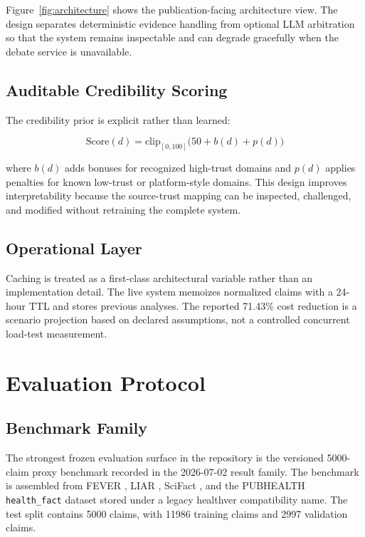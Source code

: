 \documentclass[conference]{IEEEtran}
\begin{document}
Figure~\ref{fig:architecture} shows the publication-facing architecture view. The design separates deterministic evidence handling from optional LLM arbitration so that the system remains inspectable and can degrade gracefully when the debate service is unavailable.

\subsection{Auditable Credibility Scoring}

The credibility prior is explicit rather than learned:

\[
\mathrm{Score}(d) = \mathrm{clip}_{[0,100]}\bigl(50 + b(d) + p(d)\bigr)
\]

where $b(d)$ adds bonuses for recognized high-trust domains and $p(d)$ applies penalties for known low-trust or platform-style domains. This design improves interpretability because the source-trust mapping can be inspected, challenged, and modified without retraining the complete system.

\subsection{Operational Layer}

Caching is treated as a first-class architectural variable rather than an implementation detail. The live system memoizes normalized claims with a 24-hour TTL and stores previous analyses. The reported 71.43\% cost reduction is a scenario projection based on declared assumptions, not a controlled concurrent load-test measurement.

\section{Evaluation Protocol}

\subsection{Benchmark Family}

The strongest frozen evaluation surface in the repository is the versioned 5000-claim proxy benchmark recorded in the 2026-07-02 result family. The benchmark is assembled from FEVER \cite{thorne2018fever}, LIAR \cite{wang2017liar}, SciFact \cite{wadden2020fact}, and the PUBHEALTH \texttt{health\_fact} dataset stored under a legacy healthver compatibility name. The test split contains 5000 claims, with 11986 training claims and 2997 validation claims.
\end{document}
